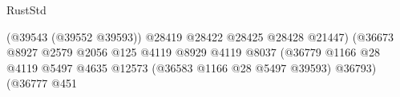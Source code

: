 \begin{lexlean}{RustStd}
\begin{coremodule}
                                                                              (@39543
                                                                                (@39552 @39593))
                                                                              @28419
                                                                              @28422
                                                                              @28425
                                                                              @28428
                                                                              @21447)
                                                                            (@36673
                                                                              @8927
                                                                              @2579
                                                                              @2056
                                                                              @125
                                                                              @4119
                                                                              @8929
                                                                              @4119
                                                                              @8037
                                                                              (@36779
                                                                                @1166
                                                                                @28
                                                                                @4119
                                                                                @5497
                                                                                @4635
                                                                                @12573
                                                                                (@36583
                                                                                  @1166
                                                                                  @28
                                                                                  @5497
                                                                                  @39593)
                                                                                @36793)
                                                                              (@36777
                                                                                @451

\end{coremodule}
\end{lexlean}
